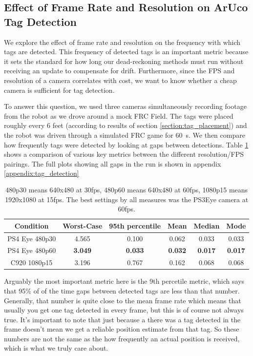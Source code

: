 \documentclass{article}
\begin{document}
	\subsection{Effect of Frame Rate and Resolution on ArUco Tag Detection}

    We explore the effect of frame rate and resolution on the frequency with which tags are detected. This frequency of detected tags is an important metric because it sets the standard for how long our dead-reckoning methods must run without receiving an update to compensate for drift. Furthermore, since the FPS and resolution of a camera correlates with cost, we want to know whether a cheap camera is sufficient for tag detection.

      To answer this question, we used three cameras simultaneously recording footage from the robot as we drove around a mock FRC Field. The tags were placed roughly every 6 feet (according to results of section \ref{section:tag_placement}) and the robot was driven through a simulated FRC game for \SI{60}{\second}. We then compare how frequently tags were detected by looking at gaps between detections. Table \ref{table:tag_detection_comparison} shows a comparison of various key metrics between the different resolution/FPS pairings. The full plots showing all gaps in the run is shown in appendix \ref{appendix:tag_detection}

    \begin{table}[H]
      \begin{tabular}{|c|c|c|c|c|c|} \hline
        Condition & Worst-Case & 95th percentile & Mean & Median & Mode \\ \hline
        PS4 Eye 480p30 & 4.565 & 0.100 & 0.062 & 0.033 & 0.033 \\ \hline
        PS4 Eye 480p60 & \textbf{3.049} & \textbf{0.033} & \textbf{0.032} & \textbf{0.017} & \textbf{0.017} \\ \hline
        C920 1080p15 & 3.196 & 0.767 & 0.162 & 0.068 & 0.068 \\ \hline
      \end{tabular}
      \caption{480p30 means 640x480 at 30fps, 480p60 means 640x480 at 60fps, 1080p15 means 1920x1080 at 15fps. The best settings by all measures was the PS3Eye camera at 60fps.}
      \label{table:tag_detection_comparison}
    \end{table}

    Arguably the most important metric here is the 9th percetile metric, which says that 95\% of of the time gaps between detected tags are less than that number. Generally, that number is quite close to the mean frame rate which means that usually you get one tag detected in every frame, but this is of course not always true. It's important to note that just because a there was a tag detected in the frame doesn't mean we get a reliable position estimate from that tag. So these numbers are not the same as the how frequently an actual position is received, which is what we truly care about.
\end{document}
